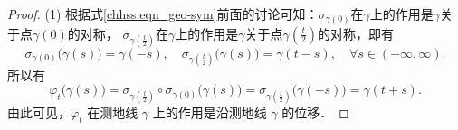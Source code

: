 \begin{proof}    
    (1) 根据式\eqref{chhss:eqn_geo-sym}前面的讨论可知：$\sigma_{\gamma(0)}$在$\gamma$上的作用是$\gamma$关于点$\gamma(0)$的对称， $\sigma_{\gamma(\frac{t}{2})}$在$\gamma$上的作用是$\gamma$关于点$\gamma(\frac{t}{2})$的对称，即有
\begin{equation}
    \sigma_{\gamma(0)}\bigl(\gamma(s)\bigr)=\gamma(-s), \quad 
    \sigma_{\gamma(\frac{t}{2})}\bigl(\gamma(s)\bigr)=\gamma(t-s)
    , \quad \forall s \in(-\infty, \infty)  .
\end{equation}
所以有
\begin{equation}
\varphi_t\bigl(\gamma(s)\bigr)=\sigma_{\gamma(\frac{t}{2})} \circ \sigma_{\gamma(0)}\bigl(\gamma(s)\bigr)=\sigma_{\gamma(\frac{t}{2})}\bigl(\gamma(-s)\bigr)=\gamma(t+s) .
\end{equation}
由此可见，$\varphi_t$ 在测地线 $\gamma$ 上的作用是沿测地线 $\gamma$ 的位移．



\end{proof}
